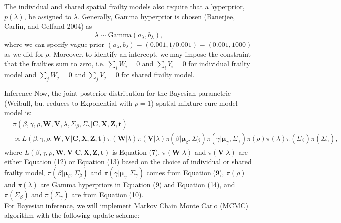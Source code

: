 \documentclass[a4paper, 12pt]{article}
\makeatletter
\renewcommand{\section}{\@startsection
	{section}    {1}    {0mm}    {-0.7\baselineskip}    {0.08\baselineskip}    {\normalfont\large\sc\center\bf}}
\makeatother
\begin{document}
The individual and shared spatial frailty models also require that a hyperprior, $p(\lambda)$,
be assigned to $\lambda$. Generally, Gamma hyperprior is chosen (Banerjee, Carlin, and
Gelfand 2004) as
\begin{equation}
\lambda \sim \mbox{Gamma} (a_{\lambda}, b_{\lambda}),
\end{equation} where we can specify vague prior $(a_{\lambda}, b_{\lambda}) = (0.001, 1/0.001) = (0.001, 1000)$ as we did for $\rho$. Moreover, to identify an intercept, we may impose the constraint that the frailties sum to zero, i.e. $\sum_i W_i = 0$ and $\sum_i V_i = 0$ for individual frailty model and $\sum_j W_j = 0$ and $\sum_j V_j = 0$ for shared frailty model.
\newpage
\section{Inference}
\noindent Now, the joint posterior distribution for the Bayesian parametric (Weibull, but reduces to Exponential with $\rho = 1$) spatial mixture cure model model is:
\begin{equation}
\begin{aligned}
&\pi({\beta}, \gamma, \rho, \mathbf{W}, \mathbf{V}, \lambda, \Sigma_{\beta}, \Sigma_{\gamma}|\mathbf{C}, \mathbf{X}, \mathbf{Z}, \mathbf{t}) \\&\propto L({\beta}, \gamma, \rho, \mathbf{W}, \mathbf{V}|\mathbf{C}, \mathbf{X}, \mathbf{Z}, \mathbf{t})\pi(\mathbf{W}|\lambda) \pi(\mathbf{V}|\lambda)\pi({\beta}|\mathbf{\mu}_{\beta}, \Sigma_{\beta}) \pi({\gamma}|\mathbf{\mu}_{\gamma}, \Sigma_{\gamma})  \pi(\rho)\pi(\lambda) \pi(\Sigma_{\beta})  \pi(\Sigma_{\gamma}),
\end{aligned}
\end{equation}
where $L({\beta}, \gamma, \rho, \mathbf{W}, \mathbf{V}|\mathbf{C}, \mathbf{X}, \mathbf{Z}, \mathbf{t})$ is Equation (7), $\pi(\mathbf{W}|\lambda)$ and $\pi(\mathbf{V}|\lambda)$ are either Equation (12) or Equation (13) based on the choice of individual or shared frailty model, $\pi({\beta}|\mathbf{\mu}_{\beta}, \Sigma_{\beta})$ and  $\pi({\gamma}|\mathbf{\mu}_{\gamma}, \Sigma_{\gamma})$ comes from Equation (9), $\pi(\rho)$ and $\pi(\lambda)$ are Gamma hyperpriors in Equation (9) and Equation (14), and $\pi(\Sigma_{\beta})$ and $\pi(\Sigma_{\gamma})$ are from Equation (10).\\ \newline
For Bayesian inference, we will implement Markov Chain Monte Carlo (MCMC) algorithm with the following update scheme:
\end{document}

